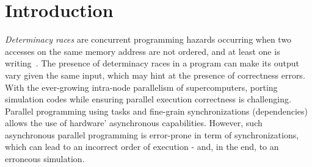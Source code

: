 \section{Introduction}


\emph{Determinacy races} are concurrent programming hazards occurring when two accesses on the same memory address are not ordered, and at least one is writing~\cite{determinator}.
The presence of determinacy races in a program can make its output vary given the same input, which may hint at the presence of correctness errors.
With the ever-growing intra-node parallelism of supercomputers, porting simulation codes while ensuring parallel execution correctness is challenging.
Parallel programming using tasks and fine-grain synchronizations (dependencies) allows the use of hardware' asynchronous capabilities.
However, such asynchronous parallel programming is error-prone in term of synchronizations, which can lead to an incorrect order of execution - and, in the end, to an erroneous simulation.

